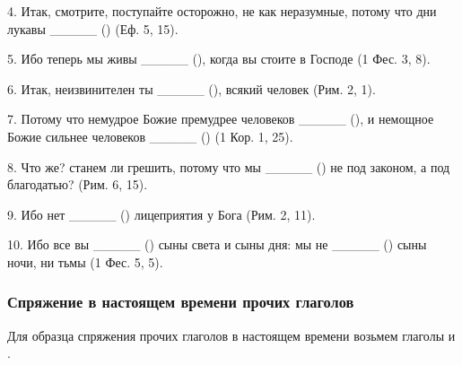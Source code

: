 \documentclass[11pt,a4paper,oneside]{memoir}
\begin{document}
    4. Итак, смотрите, поступайте осторожно, не как неразумные, потому что дни лукавы _____ ({}) (Еф. 5, 15).
    
    5. Ибо теперь мы живы _____ ({}), когда вы стоите в Господе (1 Фес. 3, 8).
    
    6. Итак, неизвинителен ты _____ ({}), всякий человек (Рим. 2, 1).
    
    7. Потому что немудрое Божие премудрее человеков _____ ({}), и немощное Божие сильнее человеков _____ ({}) (1 Кор. 1, 25).
    
    8. Что же? станем ли грешить, потому что мы _____ ({}) не под законом, а под благодатью? (Рим. 6, 15).
    
    9. Ибо нет _____ ({}) лицеприятия у Бога (Рим. 2, 11).
    
    10. Ибо все вы _____ ({}) сыны света и сыны дня: мы не _____ ({}) сыны ночи, ни тьмы (1 Фес. 5, 5).

                \subsubsection{Спряжение в настоящем времени прочих глаголов}

    Для образца спряжения прочих глаголов в настоящем времени возьмем глаголы {} и {}.
    
\end{document}
